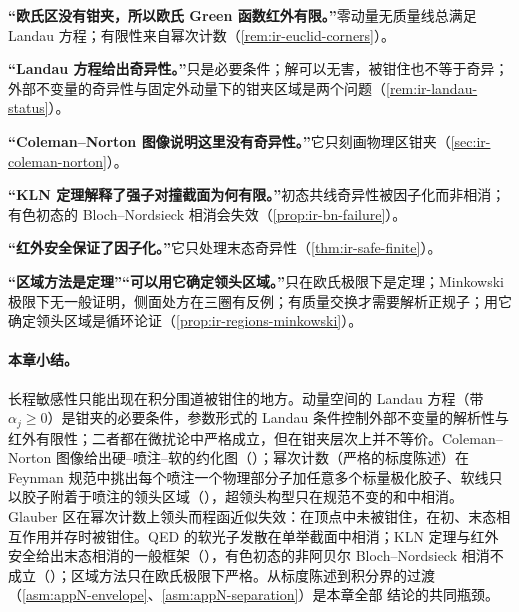 \begin{tcolorbox}[enhanced,breakable,title=常见误解,fonttitle=\bfseries,
  colback=gray!3!white,colframe=gray!55!black,boxrule=0.6pt,arc=2pt,
  left=5pt,right=5pt,top=3pt,bottom=3pt,before skip=6pt,after skip=6pt]
\textbf{“欧氏区没有钳夹，所以欧氏 Green 函数红外有限。”}零动量无质量线总满足 Landau 方程；有限性来自幂次计数（\cref{rem:ir-euclid-corners}）。\par
\textbf{“Landau 方程给出奇异性。”}只是必要条件；解可以无害，被钳住也不等于奇异；外部不变量的奇异性与固定外动量下的钳夹区域是两个问题（\cref{rem:ir-landau-status}）。\par
\textbf{“Coleman--Norton 图像说明这里没有奇异性。”}它只刻画物理区钳夹（\cref{sec:ir-coleman-norton}）。\par
\textbf{“KLN 定理解释了强子对撞截面为何有限。”}初态共线奇异性被因子化而非相消；有色初态的 Bloch--Nordsieck 相消会失效（\cref{prop:ir-bn-failure}）。\par
\textbf{“红外安全保证了因子化。”}它只处理末态奇异性（\cref{thm:ir-safe-finite}）。\par
\textbf{“区域方法是定理”“可以用它确定领头区域。”}只在欧氏极限下是定理；Minkowski 极限下无一般证明，侧面处方在三圈有反例；有质量交换才需要解析正规子；用它确定领头区域是循环论证（\cref{prop:ir-regions-minkowski}）。
\end{tcolorbox}

\paragraph{本章小结。}
长程敏感性只能出现在积分围道被钳住的地方。动量空间的 Landau 方程（带 $\alpha_j\ge0$）是钳夹的必要条件，参数形式的 Landau 条件控制外部不变量的解析性与红外有限性；二者都在微扰论中严格成立，但在钳夹层次上并不等价。Coleman--Norton 图像给出硬--喷注--软的约化图（\tagA）；幂次计数（严格的标度陈述）在 Feynman 规范中挑出每个喷注一个物理部分子加任意多个标量极化胶子、软线只以胶子附着于喷注的领头区域（\tagA），超领头构型只在规范不变的和中相消。Glauber 区在幂次计数上领头而程函近似失效：在顶点中未被钳住，在初、末态相互作用并存时被钳住。QED 的软光子发散在单举截面中相消；KLN 定理与红外安全给出末态相消的一般框架（\tagA），有色初态的非阿贝尔 Bloch--Nordsieck 相消不成立（\tagV）；区域方法只在欧氏极限下严格。从标度陈述到积分界的过渡（\cref{asm:appN-envelope}、\cref{asm:appN-separation}）是本章全部 \tagA 结论的共同瓶颈。

